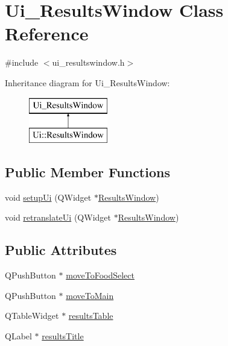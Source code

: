 \hypertarget{class_ui___results_window}{}\section{Ui\+\_\+\+Results\+Window Class Reference}
\label{class_ui___results_window}


{\ttfamily \#include $<$ui\+\_\+resultswindow.\+h$>$}

Inheritance diagram for Ui\+\_\+\+Results\+Window\+:\begin{figure}[H]
\begin{center}
\leavevmode
\includegraphics[height=2.000000cm]{class_ui___results_window}
\end{center}
\end{figure}
\subsection*{Public Member Functions}
\begin{DoxyCompactItemize}
\item 
void \mbox{\hyperlink{class_ui___results_window_aed90c2de85fe8a5e2aad1c63b6e8af71}{setup\+Ui}} (Q\+Widget $\ast$\mbox{\hyperlink{class_results_window}{Results\+Window}})
\item 
void \mbox{\hyperlink{class_ui___results_window_a373444cf96474236c90128a548afffae}{retranslate\+Ui}} (Q\+Widget $\ast$\mbox{\hyperlink{class_results_window}{Results\+Window}})
\end{DoxyCompactItemize}
\subsection*{Public Attributes}
\begin{DoxyCompactItemize}
\item 
Q\+Push\+Button $\ast$ \mbox{\hyperlink{class_ui___results_window_abc87686c6019cd99b8c639c62213fc8a}{move\+To\+Food\+Select}}
\item 
Q\+Push\+Button $\ast$ \mbox{\hyperlink{class_ui___results_window_add81048cb44e1272a8db13bba6526026}{move\+To\+Main}}
\item 
Q\+Table\+Widget $\ast$ \mbox{\hyperlink{class_ui___results_window_ad3e240eac8900a8408f496820f3f857a}{results\+Table}}
\item 
Q\+Label $\ast$ \mbox{\hyperlink{class_ui___results_window_a9ade6d6ee2528d876c0298c187f40a08}{results\+Title}}
\end{DoxyCompactItemize}


